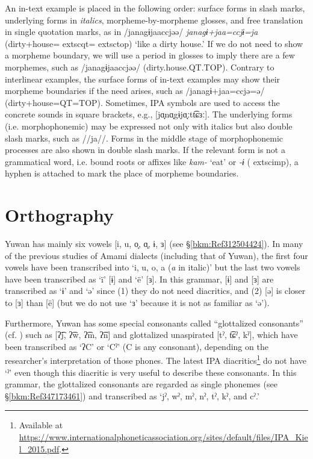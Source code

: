 An in-text example is placed in the following order: surface forms in slash marks, underlying forms in \textit{italics}, morpheme-by-morpheme glosses, and free translation in single quotation marks, as in /janagɨjaaccjəə/ \textit{janagɨ+jaa=ccjɨ=ja} (dirty+house=	extsc{qt}=	extsc{top}) ‘like a dirty house.’ If we do not need to show a morpheme boundary, we will use a period in glosses to imply there are a few morphemes, such as /janagɨjaaccjəə/ (dirty.house.QT.TOP). Contrary to interlinear examples, the surface forms of in-text examples may show their morpheme boundaries if the need arises, such as /janagɨ+jaa=ccjə=ə/ (dirty+house=QT=TOP). Sometimes, IPA symbols are used to access the concrete sounds in square brackets, e.g., [jɑ̟nɑ̟gɨjɑ̟ːtt͡ɕɜː]. The underlying forms (i.e. morphophonemic) may be expressed not only with italics but also double slash marks, such as //ja//. Forms in the middle stage of morphophonemic processes are also shown in double slash marks. If the relevant form is not a grammatical word, i.e. bound roots or affixes like \textit{kam-} ‘eat’ or \textit{{}-ɨ} (	extsc{imp}), a hyphen is attached to mark the place of morpheme boundaries.

\section*{Orthography}

Yuwan has mainly six vowels [i, u, o̞, ɑ̟, ɨ, ɜ] (see §\ref{bkm:Ref312504424}). In many of the previous studies of Amami dialects (including that of Yuwan), the first four vowels have been transcribed into ‘i, u, o, a (\textit{a} in italic)’ but the last two vowels have been transcribed as ‘ï’ [ɨ] and ‘ë’ [ɜ]. In this grammar, [ɨ] and [ɜ] are transcribed as ‘ɨ’ and ‘ə’ since (1) they do not need diacritics, and (2) [ə] is closer to [ɜ] than [ë] (but we do not use ‘ɜ’ because it is not as familiar as ‘ə’).

Furthermore, Yuwan has some special consonants called “glottalized consonants” (cf. \citealt[433]{UemuraEtAl1997}) such as [ʔ͡j, ʔ͡w, ʔ͡m, ʔ͡n] and glottalized unaspirated [tˀ, t͡ɕˀ, kˀ], which have been transcribed as ‘ʔC’ or ‘Cˀ’ (C is any consonant), depending on the researcher’s interpretation of those phones. The latest IPA diacritics\footnote{Available at \url{https://www.internationalphoneticassociation.org/sites/default/files/IPA_Kiel_2015.pdf}.} do not have ‘ˀ’ even though this diacritic is very useful to describe these consonants. In this grammar, the glottalized consonants are regarded as single phonemes (see §\ref{bkm:Ref347173461}) and transcribed as ‘jˀ, wˀ, mˀ, nˀ, tˀ, kˀ, and cˀ.’

